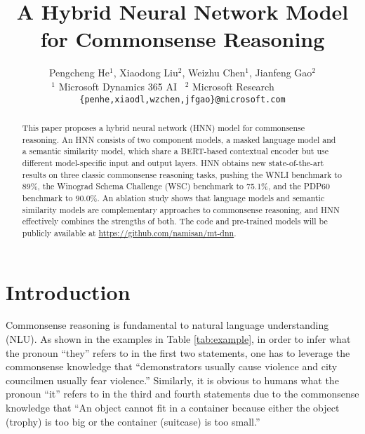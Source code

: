 \documentclass[11pt,a4paper]{article}
\title{A Hybrid Neural Network Model for Commonsense Reasoning}
\author{Pengcheng He$^1$, Xiaodong Liu$^2$, Weizhu Chen$^1$, Jianfeng Gao$^2$\\
  $^1$ Microsoft Dynamics 365 AI~
  $^2$ Microsoft Research~~~~~~~~\\
  {\tt \{penhe,xiaodl,wzchen,jfgao\}@microsoft.com}}
\begin{document}
\maketitle
\begin{abstract}
This paper proposes a hybrid neural network (HNN) model for commonsense reasoning. 
An HNN consists of two component models, a masked language model and a semantic similarity model, which share a BERT-based contextual encoder but use different model-specific input and output layers. 
HNN obtains new state-of-the-art results on three classic commonsense reasoning tasks, pushing the WNLI benchmark to 89\%, the Winograd Schema Challenge (WSC) benchmark to 75.1\%, and the PDP60 benchmark to 90.0\%.
An ablation study shows that language models and semantic similarity models are complementary approaches to commonsense reasoning, and HNN effectively combines the strengths of both.
The code and pre-trained models will be publicly available at \url{https://github.com/namisan/mt-dnn}.
\end{abstract}
\section{Introduction}
\label{sec:introduction}


Commonsense reasoning is fundamental to natural language understanding (NLU). As shown in the examples in Table \ref{tab:example}, in order to infer what the pronoun ``they'' refers to in the first two statements, one has to leverage the commonsense knowledge that ``demonstrators usually cause violence and city councilmen usually fear violence.'' Similarly, it is obvious to humans what the pronoun ``it'' refers to in the third and fourth statements due to the commonsense knowledge that ``An object cannot fit in a container because either the object (trophy) is too big or the container (suitcase) is too small.''
\end{document}
